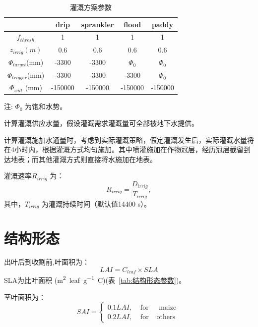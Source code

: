 \begin{table}[htbp]
  \centering
  \caption{灌溉方案参数}
  \label{tab:灌溉方案参数}
  \begin{threeparttable}
  \begin{tabular}{@{}ccccc}
  \toprule
        & drip   & sprankler   & flood   & paddy   \\ \midrule
$f_{thresh}$ & 1  & 1 & 1  & 1 \\
$z_{irrig}(m)$ & 0.6  & 0.6  & 0.6  & 0.6  \\
$\Phi_{target}$(mm) & -3300    & -3300  & $\Phi_0$ & $\Phi_0$  \\
$\Phi_{trigger}$(mm) & -3300 & -3300 & -3300  & $\Phi_0$  \\
$\Phi_{wilt}$ (mm)   & -150000    & -150000    & -150000    & -150000   \\\bottomrule
\end{tabular}
\begin{tablenotes}
    \footnotesize
    \item[注:] $\Phi_0$ 为饱和水势。
\end{tablenotes}
\end{threeparttable}    
\end{table}

计算灌溉供应水量，假设灌溉需求灌溉量可全部被地下水提供。

计算灌溉施加水通量时，考虑到实际灌溉策略，假定灌溉发生后，实际灌溉水量将在4小时内，根据灌溉方式均匀施加。其中喷灌施加在作物冠层，经历冠层截留到达地表；而其他灌溉方式则直接将水施加在地表。

灌溉速率$R_{irrig}$ 为：
\begin{equation}
    R_{irrig} = \frac{D_{irrig}}{T_{irrig}},
\end{equation}
其中，$T_{irrig}$ 为灌溉持续时间（默认值14400 s）。
\section{结构形态}
出叶后到收割前,叶面积为：
\begin{equation}
LAI=C_{leaf} \times SLA
\end{equation}
SLA为比叶面积 (\unit{m^2.leaf.g^{-1}.C})(表~\ref{tab:结构形态参数})。

茎叶面积为：
\begin{equation}
SAI=\left\{\begin{array}{lcc}0.1 LAI, & \text { for } & \text { maize } \\
   0.2 LAI, & \text { for } & \text {others}\end{array}\right.
\end{equation}

